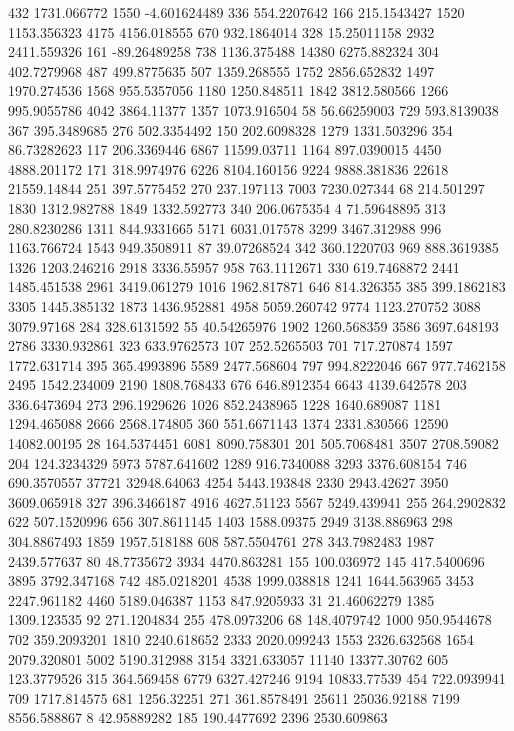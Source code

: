 432	1731.066772
1550	-4.601624489
336	554.2207642
166	215.1543427
1520	1153.356323
4175	4156.018555
670	932.1864014
328	15.25011158
2932	2411.559326
161	-89.26489258
738	1136.375488
14380	6275.882324
304	402.7279968
487	499.8775635
507	1359.268555
1752	2856.652832
1497	1970.274536
1568	955.5357056
1180	1250.848511
1842	3812.580566
1266	995.9055786
4042	3864.11377
1357	1073.916504
58	56.66259003
729	593.8139038
367	395.3489685
276	502.3354492
150	202.6098328
1279	1331.503296
354	86.73282623
117	206.3369446
6867	11599.03711
1164	897.0390015
4450	4888.201172
171	318.9974976
6226	8104.160156
9224	9888.381836
22618	21559.14844
251	397.5775452
270	237.197113
7003	7230.027344
68	214.501297
1830	1312.982788
1849	1332.592773
340	206.0675354
4	71.59648895
313	280.8230286
1311	844.9331665
5171	6031.017578
3299	3467.312988
996	1163.766724
1543	949.3508911
87	39.07268524
342	360.1220703
969	888.3619385
1326	1203.246216
2918	3336.55957
958	763.1112671
330	619.7468872
2441	1485.451538
2961	3419.061279
1016	1962.817871
646	814.326355
385	399.1862183
3305	1445.385132
1873	1436.952881
4958	5059.260742
9774	1123.270752
3088	3079.97168
284	328.6131592
55	40.54265976
1902	1260.568359
3586	3697.648193
2786	3330.932861
323	633.9762573
107	252.5265503
701	717.270874
1597	1772.631714
395	365.4993896
5589	2477.568604
797	994.8222046
667	977.7462158
2495	1542.234009
2190	1808.768433
676	646.8912354
6643	4139.642578
203	336.6473694
273	296.1929626
1026	852.2438965
1228	1640.689087
1181	1294.465088
2666	2568.174805
360	551.6671143
1374	2331.830566
12590	14082.00195
28	164.5374451
6081	8090.758301
201	505.7068481
3507	2708.59082
204	124.3234329
5973	5787.641602
1289	916.7340088
3293	3376.608154
746	690.3570557
37721	32948.64063
4254	5443.193848
2330	2943.42627
3950	3609.065918
327	396.3466187
4916	4627.51123
5567	5249.439941
255	264.2902832
622	507.1520996
656	307.8611145
1403	1588.09375
2949	3138.886963
298	304.8867493
1859	1957.518188
608	587.5504761
278	343.7982483
1987	2439.577637
80	48.7735672
3934	4470.863281
155	100.036972
145	417.5400696
3895	3792.347168
742	485.0218201
4538	1999.038818
1241	1644.563965
3453	2247.961182
4460	5189.046387
1153	847.9205933
31	21.46062279
1385	1309.123535
92	271.1204834
255	478.0973206
68	148.4079742
1000	950.9544678
702	359.2093201
1810	2240.618652
2333	2020.099243
1553	2326.632568
1654	2079.320801
5002	5190.312988
3154	3321.633057
11140	13377.30762
605	123.3779526
315	364.569458
6779	6327.427246
9194	10833.77539
454	722.0939941
709	1717.814575
681	1256.32251
271	361.8578491
25611	25036.92188
7199	8556.588867
8	42.95889282
185	190.4477692
2396	2530.609863
